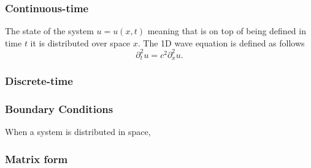 \subsubsection{Continuous-time}
The state of the system $u=u(x,t)$ meaning that is on top of being defined in time $t$ it is distributed over space $x$. The 1D wave equation is defined as follows
\begin{equation}
    \partial^2_t u = c^2 \partial^2_x u.
\end{equation}


\subsubsection{Discrete-time}

\subsubsection{Boundary Conditions}
When a system is distributed in space, 

\subsubsection{Matrix form}

